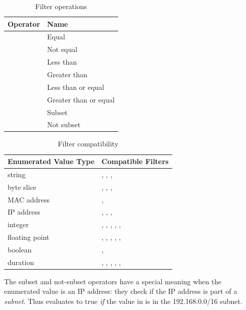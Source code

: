 \begin{table}[H]
\begin{tabular}{ll}
\textbf{Operator} & \textbf{Name} \\
\hline
\code{==} &	Equal \\
\code{!=} &	Not equal  \\
\code{<} &	Less than  \\
\code{>} &	Greater than \\
\code{<=} &	Less than or equal \\
\code{>=} &	Greater than or equal \\
\code{\textasciitilde} &	Subset \\
\code{!\textasciitilde} &	Not subset \\
\end{tabular}
\caption{Filter operations}
\label{table:filter-ops}
\end{table}

\begin{table}[H]
\begin{tabular}{ll}
\textbf{Enumerated Value Type} & \textbf{Compatible Filters} \\
\hline
string & \code{==}, \code{!=}, \code{\textasciitilde}, \code{!\textasciitilde} \\
byte slice & \code{==}, \code{!=}, \code{\textasciitilde}, \code{!\textasciitilde} \\
MAC address & \code{==}, \code{!=} \\
IP address & \code{==}, \code{!=}, \code{\textasciitilde}, \code{!\textasciitilde} \\
integer & \code{==}, \code{!=}, \code{<}, \code{>}, \code{<=}, \code{>=} \\
floating point & \code{==}, \code{!=}, \code{<}, \code{>}, \code{<=}, \code{>=} \\
boolean & \code{==}, \code{!=} \\
duration & \code{==}, \code{!=}, \code{<}, \code{>}, \code{<=}, \code{>=} \\
\end{tabular}
\caption{Filter compatibility}
\label{table:filter-compatibility}
\end{table}

The subset and not-subset operators have a special meaning when the enumerated value is an IP address: they check if the IP address is part of a \emph{subnet}. Thus  evaluates to true \emph{if} the value in  is in the 192.168.0.0/16 subnet.

